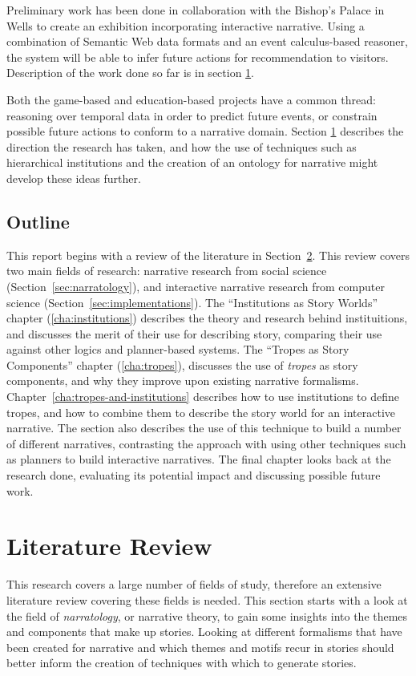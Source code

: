 \documentclass[11pt]{report}
\begin{document}
Preliminary work has been done in collaboration with the Bishop's Palace in Wells to create an exhibition incorporating interactive narrative. Using a combination of Semantic Web data formats and an event calculus-based reasoner, the system will be able to infer future actions for recommendation to visitors. Description of the work done so far is in section \ref{}.

Both the game-based and education-based projects have a common thread: reasoning
over temporal data in order to predict future events, or constrain possible
future actions to conform to a narrative domain. Section \ref{}
describes the direction the research has taken, and how the use of techniques such as hierarchical institutions and the creation of an ontology for narrative might develop these ideas further.

\section{Outline}
This report begins with a review of the literature in Section~\ref{cha:literature-review}. This review covers two main fields of research: narrative research from social science (Section~\ref{sec:narratology}), and interactive narrative research from computer science (Section~\ref{sec:implementations}).
The ``Institutions as Story Worlds'' chapter (\ref{cha:institutions}) describes the theory and research behind instituitions, and discusses the merit of their use for describing story, comparing their use against other logics and planner-based systems.
The ``Tropes as Story Components'' chapter (\ref{cha:tropes}), discusses the use
of \emph{tropes} as story components, and why they improve upon existing narrative formalisms.
Chapter~\ref{cha:tropes-and-institutions} describes how to use institutions to define tropes, and how to combine them to describe the story world for an interactive narrative. The section also describes the use of this technique to build a number of different narratives, contrasting the approach with using other techniques such as planners to build interactive narratives.
The final chapter looks back at the research done, evaluating its potential impact and discussing possible future work. 

\chapter{Literature Review}
\label{cha:literature-review}
This research covers a large number of fields of study, therefore an extensive
literature review covering these fields is needed. This section starts with a
look at the field of \emph{narratology}, or narrative theory, to gain some
insights into the themes and components that make up stories. Looking at
different formalisms that have been created for narrative and which themes and
motifs recur in stories should better inform the creation of techniques with
which to generate stories.
\end{document}
